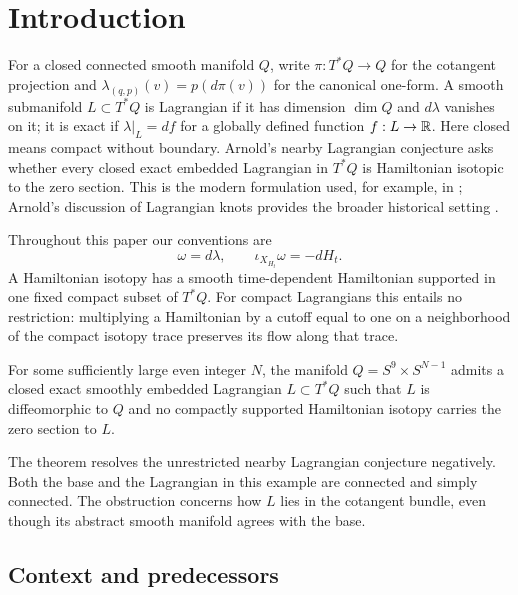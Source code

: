 \section{Introduction}\label{sec:introduction}

For a closed connected smooth manifold $Q$, write $\pi:T^*Q\to Q$ for
the cotangent projection and
$\lambda_{(q,p)}(v)=p(d\pi(v))$ for the canonical one-form. A smooth
submanifold $L\subset T^*Q$ is Lagrangian if it has dimension $\dim Q$
and $d\lambda$ vanishes on it; it is exact if $\lambda|_L=df$ for a
globally defined function $f:L\to\mathbb R$. Here closed means compact without
boundary. Arnold's nearby Lagrangian conjecture asks whether every closed
exact embedded Lagrangian in $T^*Q$ is Hamiltonian isotopic to the zero
section. This is the modern formulation used, for example, in
\cite{Abouzaid2012,Kragh2013}; Arnold's discussion of Lagrangian knots
provides the broader historical setting \cite{Arnold1986}.

Throughout this paper our conventions are
\[
  \omega=d\lambda,\qquad \iota_{X_{H_t}}\omega=-dH_t.
\]
A Hamiltonian isotopy has a smooth time-dependent Hamiltonian supported
in one fixed compact subset of $T^*Q$. For compact Lagrangians this
entails no restriction: multiplying a Hamiltonian by a cutoff equal to
one on a neighborhood of the compact isotopy trace preserves its flow
along that trace.

\begin{theorem}\label{thm:main}
For some sufficiently large even integer $N$, the manifold
$Q=S^9\times S^{N-1}$ admits a closed exact smoothly embedded Lagrangian
$L\subset T^*Q$ such that $L$ is diffeomorphic to $Q$ and no compactly
supported Hamiltonian isotopy carries the zero section to $L$.
\end{theorem}

The theorem resolves the unrestricted nearby Lagrangian conjecture
negatively. Both the base and the Lagrangian in this example are
connected and simply connected. The obstruction concerns how $L$ lies
in the cotangent bundle, even though its abstract smooth manifold agrees
with the base.

\subsection{Context and predecessors}

